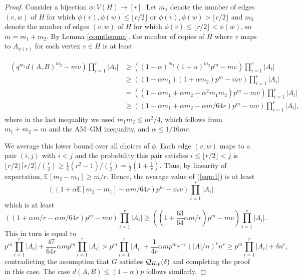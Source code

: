 \documentclass[11pt]{article}
\begin{document}
\begin{proof}
Consider a bijection $\phi:V(H) \rightarrow [r]$. Let $m_1$ denote the number of edges $(v,w)$ of $H$ for which $\phi(v),\phi(w) \leq   \lfloor r/2 \rfloor $ or $\phi(v),\phi(w) >  \lfloor r/2 \rfloor$ and $m_2$ denote the number of edges $(v,w)$ of $H$ for which $\phi(v) \leq   \lfloor r/2 \rfloor < \phi(w)$, so $m=m_1+m_2$. By Lemma \ref{countlemma}, the number of copies of $H$ where $v$ maps to $A_{\phi(v)}$ for each vertex $v \in H$ is at least

\begin{align}
\label{eqn:1}
\begin{split}
\left(q^{m_1}d(A,B)^{m_2}-m\upsilon\right)\prod_{i=1}^r |A_i| & \geq   \left((1-\alpha)^{m_1}(1+\alpha)^{m_2}p^m-m\upsilon\right)\prod_{i=1}^r |A_i| \\ & \geq  \left((1-\alpha m_1)(1+\alpha m_2)p^m-m\upsilon\right)\prod_{i=1}^r |A_i| \\ & =  \left((1-\alpha m_1 + \alpha m_2- \alpha^2 m_1m_2)p^m-m\upsilon\right)\prod_{i=1}^r |A_i| \\ & \geq 
 \left((1- \alpha m_1 + \alpha m_2- \alpha m/64r )p^m-m\upsilon\right)\prod_{i=1}^r |A_i|, \end{split}
\end{align}
where in the last inequality we used $m_1m_2 \leq m^2/4$, which follows from $m_1+m_2=m$ and the AM--GM inequality, and $\alpha \leq 1/16mr$. 

We average this lower bound over all choices of $\phi$. Each edge $(v,w)$ maps to a pair $(i,j)$ with $i<j$ and the probability this pair satisfies $i \leq \lfloor r/2 \rfloor < j$ is $\lfloor r/2 \rfloor \lceil r/2 \rceil /{r \choose 2} \geq \frac{1}{4}(r^2-1)/{r \choose 2}=\frac{1}{2}\left(1+\frac{1}{r}\right)$. Thus, by linearity of expectation, $\mathbb{E}[m_2-m_1] \geq m/r$. Hence, the average value of (\ref{eqn:1}) is at least 
$$ \left(\left(1+\alpha\mathbb{E}[m_2-m_1]-\alpha m/64r\right)p^m-m\upsilon\right)\prod_{i=1}^r |A_i|$$ 
which is at least 
$$\left(\left(1+\alpha m/r-\alpha m/64r\right)p^m-m\upsilon\right)\prod_{i=1}^r |A_i| \geq 
\left(\left(1+\frac{63}{64}\alpha m/r\right)p^m-m\upsilon\right)\prod_{i=1}^r |A_i|.$$
This in turn is equal to $$p^m\prod_{i=1}^r |A_i| + \frac{47}{64r}\alpha mp^m \prod_{i=1}^r |A_i| > p^m\prod_{i=1}^r |A_i| + \frac{1}{4r}\alpha mp^m r^{-r} (|A|/n)^r n^r \geq  p^m\prod_{i=1}^r |A_i| +\delta n^r,$$
contradicting the assumption that $G$ satisfies ${\cal Q}_{H,p}(\delta)$ and completing the proof in this case. The case $d(A,B) \leq  (1-\alpha)p$ follows similarly.%
\end{proof}
\end{document}
